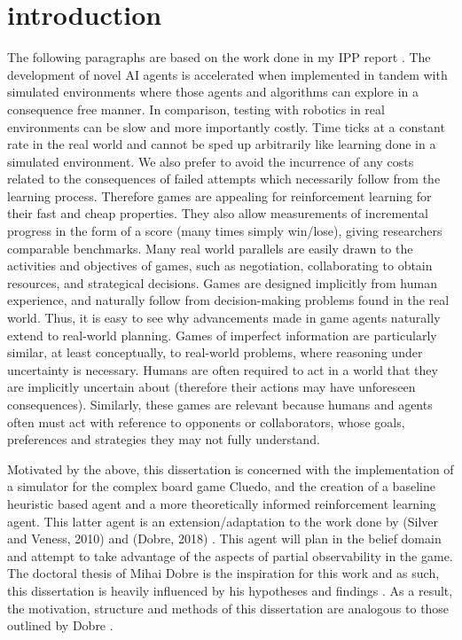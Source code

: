 \documentclass[msc, deptreport, ai, romanprepages]{infthesis}
\begin{document}
\chapter{introduction}
The following paragraphs are based on the work done in my IPP report \cite{IPP}. The development of novel AI agents is accelerated when implemented in tandem with simulated environments where those agents and algorithms can explore in a consequence free manner. In comparison, testing with robotics in real environments can be slow and more importantly costly. Time ticks at a constant rate in the real world and cannot be sped up arbitrarily like learning done in a simulated environment. We also prefer to avoid the incurrence of any costs related to the consequences of failed attempts which necessarily follow from the learning process. Therefore games are appealing for reinforcement learning for their fast and cheap properties. They also allow measurements of incremental progress in the form of a score (many times simply win/lose), giving researchers comparable benchmarks. Many real world parallels are easily drawn to the activities and objectives of games, such as negotiation, collaborating to obtain resources, and strategical decisions. Games are designed implicitly from human experience, and naturally follow from decision-making problems found in the real world. Thus, it is easy to see why advancements made in game agents naturally extend to real-world planning. Games of imperfect information are particularly similar, at least conceptually, to real-world problems, where reasoning under uncertainty is necessary. Humans are often required to act in a world that they are implicitly uncertain about (therefore their actions may have unforeseen consequences). Similarly, these games are relevant because humans and agents often must act with reference to opponents or collaborators, whose goals, preferences and strategies they may not fully understand. 

Motivated by the above, this dissertation is concerned with the implementation of a simulator for the complex board game Cluedo, and the creation of a baseline heuristic based agent and a more theoretically informed reinforcement learning agent. This latter agent is an extension/adaptation to the work done by (Silver and Veness, 2010) and (Dobre, 2018) \cite{Silver-veness} \cite{Mihai}. This agent will plan in the belief domain and attempt to take advantage of the aspects of partial observability in the game. The doctoral thesis of Mihai Dobre is the inspiration for this work and as such, this dissertation is heavily influenced by his hypotheses and findings \cite{Mihai}. As a result, the motivation, structure and methods of this dissertation are analogous to those outlined by Dobre \cite{Mihai}. 
\end{document}
